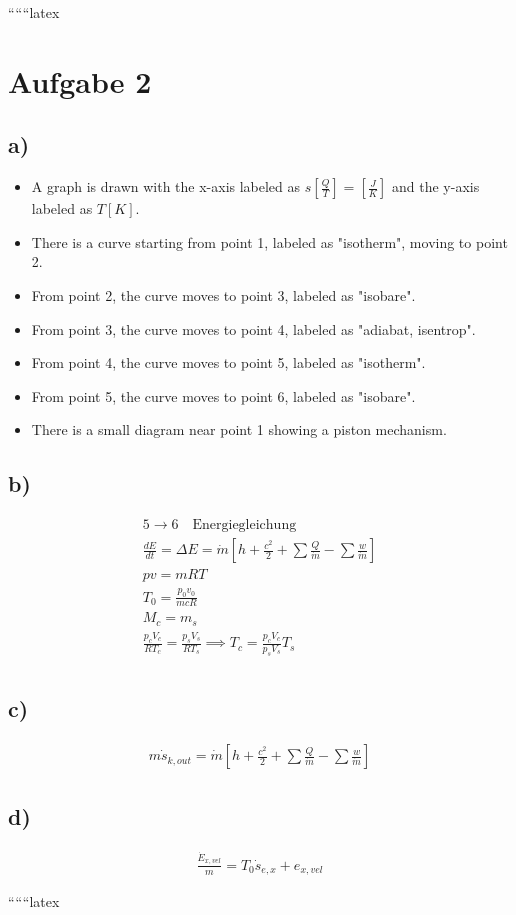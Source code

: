 
``````latex


\section*{Aufgabe 2}

\subsection*{a)}

\begin{itemize}
    \item A graph is drawn with the x-axis labeled as $s \left[ \frac{Q}{T} \right] = \left[ \frac{J}{K} \right]$ and the y-axis labeled as $T \left[ K \right]$.
    \item There is a curve starting from point 1, labeled as "isotherm", moving to point 2.
    \item From point 2, the curve moves to point 3, labeled as "isobare".
    \item From point 3, the curve moves to point 4, labeled as "adiabat, isentrop".
    \item From point 4, the curve moves to point 5, labeled as "isotherm".
    \item From point 5, the curve moves to point 6, labeled as "isobare".
    \item There is a small diagram near point 1 showing a piston mechanism.
\end{itemize}

\subsection*{b)}

\begin{align*}
    5 \rightarrow 6 \quad \text{Energiegleichung} \\
    \frac{dE}{dt} = \Delta E = \dot{m} \left[ h + \frac{c^2}{2} + \sum \frac{Q}{\dot{m}} - \sum \frac{w}{\dot{m}} \right] \\
    p v = m R T \\
    T_0 = \frac{p_0 v_0}{m c R} \\
    M_c = m_s \\
    \frac{p_c V_c}{R T_c} = \frac{p_s V_s}{R T_s} \implies T_c = \frac{p_c V_c}{p_s V_s} T_s \\
\end{align*}

\subsection*{c)}

\begin{align*}
    m \dot{s}_{k, out} = \dot{m} \left[ h + \frac{c^2}{2} + \sum \frac{Q}{\dot{m}} - \sum \frac{w}{\dot{m}} \right]
\end{align*}

\subsection*{d)}

\begin{align*}
    \frac{\dot{E}_{x, vel}}{m} = T_0 \dot{s}_{e, x} + e_{x, vel}
\end{align*}

``````latex


